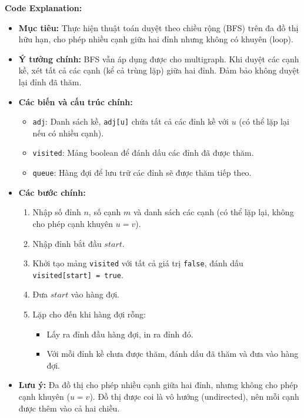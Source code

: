 \documentclass{article}
\begin{document}
\textbf{Code Explanation:}

\begin{itemize}
    \item \textbf{Mục tiêu:} Thực hiện thuật toán duyệt theo chiều rộng (BFS) trên đa đồ thị hữu hạn, cho phép nhiều cạnh giữa hai đỉnh nhưng không có khuyên (loop).
    \item \textbf{Ý tưởng chính:} BFS vẫn áp dụng được cho multigraph. Khi duyệt các cạnh kề, xét tất cả các cạnh (kể cả trùng lặp) giữa hai đỉnh. Đảm bảo không duyệt lại đỉnh đã thăm.
    \item \textbf{Các biến và cấu trúc chính:}
    \begin{itemize}
        \item \texttt{adj}: Danh sách kề, \texttt{adj[u]} chứa tất cả các đỉnh kề với $u$ (có thể lặp lại nếu có nhiều cạnh).
        \item \texttt{visited}: Mảng boolean để đánh dấu các đỉnh đã được thăm.
        \item \texttt{queue}: Hàng đợi để lưu trữ các đỉnh sẽ được thăm tiếp theo.
    \end{itemize}
    \item \textbf{Các bước chính:}
    \begin{enumerate}
        \item Nhập số đỉnh $n$, số cạnh $m$ và danh sách các cạnh (có thể lặp lại, không cho phép cạnh khuyên $u = v$).
        \item Nhập đỉnh bắt đầu $start$.
        \item Khởi tạo mảng \texttt{visited} với tất cả giá trị \texttt{false}, đánh dấu \texttt{visited[start] = true}.
        \item Đưa $start$ vào hàng đợi.
        \item Lặp cho đến khi hàng đợi rỗng:
        \begin{itemize}
            \item Lấy ra đỉnh đầu hàng đợi, in ra đỉnh đó.
            \item Với mỗi đỉnh kề chưa được thăm, đánh dấu đã thăm và đưa vào hàng đợi.
        \end{itemize}
    \end{enumerate}
    \item \textbf{Lưu ý:} Đa đồ thị cho phép nhiều cạnh giữa hai đỉnh, nhưng không cho phép cạnh khuyên ($u = v$). Đồ thị được coi là vô hướng (undirected), nên mỗi cạnh được thêm vào cả hai chiều.
\end{itemize}
\end{document}
